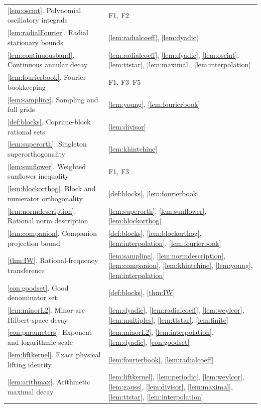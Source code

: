 \documentclass[11pt,oneside]{article}
\theoremstyle{definition}\newtheorem{definition}[theorem]{Definition}
\theoremstyle{remark}\newtheorem{remark}[theorem]{Remark}
\begin{document}
\begin{longtable}{@{}p{}p{}@{}}
\ref{lem:oscint}. Polynomial oscillatory integrals & F1, F2 \\
\ref{lem:radialFourier}. Radial stationary bounds & \ref{lem:radialcoeff}, \ref{lem:dyadic} \\
\ref{lem:continuousband}. Continuous annular decay & \ref{lem:radialcoeff}, \ref{lem:dyadic}, \ref{lem:oscint}, \ref{lem:ttstar}, \ref{lem:maximal}, \ref{lem:interpolation} \\
\ref{lem:fourierbook}. Fourier bookkeeping & F1, F3--F5 \\
\ref{lem:sampling}. Sampling and full grids & \ref{lem:young}, \ref{lem:fourierbook} \\
\ref{def:blocks}. Coprime-block rational sets & \ref{lem:divisor} \\
\ref{lem:superorth}. Singleton superorthogonality & \ref{lem:khintchine} \\
\ref{lem:sunflower}. Weighted sunflower inequality & F1, F3 \\
\ref{lem:blockorthog}. Block and numerator orthogonality & \ref{def:blocks}, \ref{lem:fourierbook} \\
\ref{lem:normdescription}. Rational norm description & \ref{lem:superorth}, \ref{lem:sunflower}, \ref{lem:blockorthog} \\
\ref{lem:companion}. Companion projection bound & \ref{def:blocks}, \ref{lem:blockorthog}, \ref{lem:interpolation}, \ref{lem:fourierbook} \\
\ref{thm:IW}. Rational-frequency transference & \ref{lem:sampling}, \ref{lem:normdescription}, \ref{lem:companion}, \ref{lem:khintchine}, \ref{lem:young}, \ref{lem:interpolation} \\
\ref{con:goodset}. Good denominator set & \ref{def:blocks}, \ref{thm:IW} \\
\ref{lem:minorL2}. Minor-arc Hilbert-space decay & \ref{lem:dyadic}, \ref{lem:radialcoeff}, \ref{lem:weylcor}, \ref{lem:multiples}, \ref{lem:ttstar}, \ref{lem:finite} \\
\ref{con:parameters}. Exponent and logarithmic scale & \ref{lem:minorL2}, \ref{lem:interpolation}, \ref{lem:dyadic}, \ref{con:goodset} \\
\ref{lem:liftkernel}. Exact physical lifting identity & \ref{lem:fourierbook}, \ref{lem:radialcoeff} \\
\ref{lem:arithmax}. Arithmetic maximal decay & \ref{lem:liftkernel}, \ref{lem:periodic}, \ref{lem:weylcor}, \ref{lem:gauss}, \ref{lem:divisor}, \ref{lem:maximal}, \ref{lem:ttstar}, \ref{lem:interpolation} \\

\end{longtable}
\end{document}
